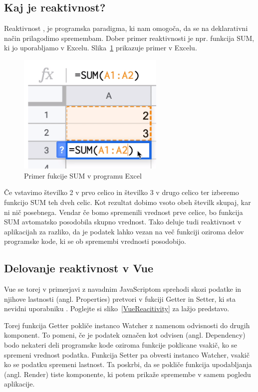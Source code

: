 \documentclass[a4paper, 12pt]{book}
\begin{document}
\subsection {Kaj je reaktivnost?}
Reaktivnost \cite{reaktivnost}, je programska paradigma, ki nam omogoča, da se na deklarativni način prilagodimo spremembam. Dober primer reaktivnosti je npr. funkcija SUM, ki jo uporabljamo v Excelu. Slika~\ref{Excel-SUM} prikazuje primer v Excelu.
\begin{figure}[h]
\begin{center}
\includegraphics[width=7cm]{Excel-SUM.png}
\end{center}
\caption{Primer fukcije SUM v programu Excel}
\label{Excel-SUM}
\end{figure}

Če vstavimo številko 2 v prvo celico in številko 3 v drugo celico ter izberemo funkcijo SUM teh dveh celic. Kot rezultat dobimo vsoto obeh številk skupaj, kar ni nič posebnega. Vendar če bomo spremenili vrednost prve celice, bo funkcija SUM avtomatsko posodobila skupno vrednost. Tako deluje tudi reaktivnost v aplikacijah za razliko, da je podatek lahko vezan na več funkciji oziroma delov programske kode, ki se ob spremembi vrednosti posodobijo.

\subsection {Delovanje reaktivnost v Vue}
Vue se torej v primerjavi z navadnim JavaScriptom sprehodi skozi podatke in njihove lastnosti (angl. Properties) pretvori v fukciji Getter in Setter, ki sta nevidni uporabniku \cite{delovanjeReaktivnost}. Poglejte si sliko~\ref{VueReacitivity} za lažjo predstavo. 

Torej funkcija Getter pokliče instanco Watcher z namenom odvisnosti do drugih komponent. To pomeni, če je podatek označen kot odvisen (angl.  Dependency) bodo nekateri deli programske kode oziroma funkcije poklicane vsakič, ko se spremeni vrednost podatka. Funkcija Setter pa obvesti instanco Watcher, vsakič ko se podatku spremeni lastnost. Ta poskrbi, da se pokliče funkcija upodabljanja (angl. Render) tiste komponente, ki potem prikaže spremembe v samem pogledu aplikacije. 
\end{document}
